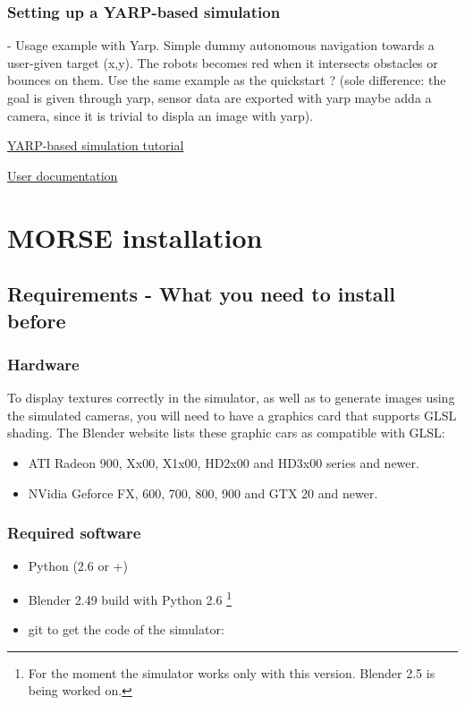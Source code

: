 \documentclass[twoside,a4paper,10pt]{report}
\newcommand{\dokutitlelevelone}[1]{\chapter{#1}}
\newcommand{\dokutitleleveltwo}[1]{\section{#1}}
\newcommand{\dokutitleleveltree}[1]{\subsection{#1}}
\newcommand{\dokufootnote}[1]{\footnote{#1}}
\newcommand{\dokuitem}{\item}
\newcommand{\dokuquoting}{\textbar}
\begin{document}
\dokutitleleveltree{Setting up a YARP-based simulation}
\label{a3bba0b321b28de69351875f85d854db}%
- Usage example with Yarp. Simple dummy autonomous navigation towards a user-given target (x,y). The robots becomes red when it intersects obstacles or bounces on them. Use the same example as the quickstart ? (sole difference: the goal is given through yarp, sensor data are exported with yarp  maybe adda a camera, since it is trivial to displa an image with yarp).

\hyperref[1dd029a60f7f3dd1deaf993ce4538edf]{ YARP-based simulation tutorial}

{\dokuquoting}{\dokuquoting} \hyperref[a80da1282f2c775bbc5f2c92c836968b]{ User documentation}


\dokutitlelevelone{MORSE installation}
\label{1d96fd68defedd8a755f2a95c80e618f}%
\label{ea09bb364ef1bffd889e76b7a59035fc}%

\dokutitleleveltwo{Requirements - What you need to install before}
\label{27060cbab4a02c4805c03a15b2aad7d7}%

\dokutitleleveltree{Hardware}
\label{3ca14c518d1bf901acc339e7c9cd6d7f}%

To display textures correctly in the simulator, as well as to generate images using the simulated cameras, you will need to have a graphics card that supports GLSL shading. The Blender website lists these graphic cars as compatible with GLSL:


\begin{itemize}
\dokuitem  ATI Radeon 9{\texttimes}00, Xx00, X1x00, HD2x00 and HD3x00 series and newer.
\dokuitem  NVidia Geforce FX, 6{\texttimes}00, 7{\texttimes}00, 8{\texttimes}00, 9{\texttimes}00 and GTX 2{\texttimes}0 and newer.
\end{itemize}

\dokutitleleveltree{Required software}
\label{accfa4c836a5caff827d9adbf6bea7dc}%

\begin{itemize}
\dokuitem  Python (2.6 or +)
\dokuitem  Blender 2.49 build with Python 2.6 \dokufootnote{For the moment the simulator works only with this version. Blender 2.5 is being worked on.}
\dokuitem  git to get the code of the simulator:
\end{itemize}

\small
{}
\normalsize
\end{document}
